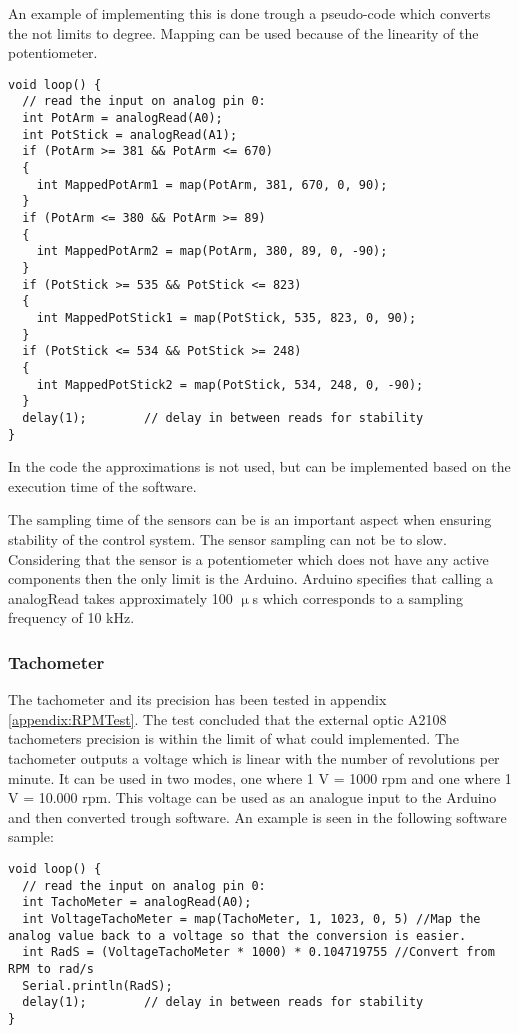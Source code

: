 \startexplain
\stopexplain

An example of implementing this is done trough a pseudo-code which converts the not limits to degree. Mapping can be used because of the linearity of the potentiometer.
\begin{lstlisting}
void loop() {
  // read the input on analog pin 0:
  int PotArm = analogRead(A0);
  int PotStick = analogRead(A1);
  if (PotArm >= 381 && PotArm <= 670)
  {
    int MappedPotArm1 = map(PotArm, 381, 670, 0, 90);
  }
  if (PotArm <= 380 && PotArm >= 89)
  {
    int MappedPotArm2 = map(PotArm, 380, 89, 0, -90);
  }
  if (PotStick >= 535 && PotStick <= 823)
  {
    int MappedPotStick1 = map(PotStick, 535, 823, 0, 90);
  }
  if (PotStick <= 534 && PotStick >= 248)
  {
    int MappedPotStick2 = map(PotStick, 534, 248, 0, -90);
  }
  delay(1);        // delay in between reads for stability
}
\end{lstlisting}    

In the code the approximations is not used, but can be implemented based on the execution time of the software.

The sampling time of the sensors can be is an important aspect when ensuring stability of the control system. The sensor sampling can not be to slow. Considering that the sensor is a potentiometer which does not have any active components then the only limit is the Arduino. Arduino specifies that calling a analogRead takes approximately 100 $\upmu$s which corresponds to a sampling frequency of 10 kHz. 

\subsubsection*{Tachometer}
The tachometer and its precision has been tested in appendix \ref{appendix:RPMTest}. The test concluded that the external optic A2108 tachometers precision is within the limit of what could implemented. The tachometer outputs a voltage which is linear with the number of revolutions per minute. It can be used in two modes, one where 1 V = 1000 rpm and one where 1 V = 10.000 rpm. This voltage can be used as an analogue input to the Arduino and then converted trough software. An example is seen in the following software sample: 

\begin{lstlisting}
void loop() {
  // read the input on analog pin 0:
  int TachoMeter = analogRead(A0);
  int VoltageTachoMeter = map(TachoMeter, 1, 1023, 0, 5) //Map the analog value back to a voltage so that the conversion is easier.
  int RadS = (VoltageTachoMeter * 1000) * 0.104719755 //Convert from RPM to rad/s
  Serial.println(RadS);
  delay(1);        // delay in between reads for stability
}
\end{lstlisting}  

